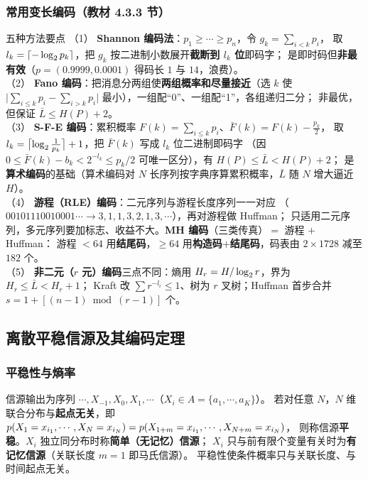 \subsubsection{常用变长编码（教材 4.3.3 节）}
\begin{keypoint}{五种方法要点}
（1） \textbf{Shannon 编码法}：$p_1\ge\cdots\ge p_n$，令 $g_k=\sum_{i<k}p_i$，
取 $l_k=\left\lceil-\log_{2} p_k\right\rceil$，把 $g_k$ 按二进制小数展开\textbf{截断到 $l_k$ 位}即码字；
是即时码但\textbf{非最有效}（$p=(0.9999,0.0001)$ 得码长 $1$ 与 $14$，浪费）。\\
（2） \textbf{Fano 编码}：把消息分两组使\textbf{两组概率和尽量接近}（选 $k$ 使
$\bigl|\sum_{i\le k}p_i-\sum_{i>k}p_i\bigr|$ 最小），一组配“0”、一组配“1”，各组递归二分；
非最优，但保证 $\bar L\le H(P)+2$。\\
（3） \textbf{S-F-E 编码}：累积概率 $F(k)=\sum_{i\le k}p_i$、$\bar F(k)=F(k)-\frac{p_k}{2}$，
取 $l_k=\bigl\lceil\log_{2}\frac{1}{p_k}\bigr\rceil+1$，把 $\bar F(k)$ 写成 $l_k$ 位二进制即码字
（因 $0\le\bar F(k)-b_k<2^{-l_k}\le p_k/2$ 可唯一区分），有 $H(P)\le\bar L<H(P)+2$；
是\textbf{算术编码}的基础（算术编码对 $N$ 长序列按字典序算累积概率，$\bar L$ 随 $N$ 增大逼近 $H$）。\\
（4） \textbf{游程（RLE）编码}：二元序列与游程长度序列一一对应
（$00101110010001\cdots\to3,1,1,3,2,1,3,\cdots$），再对游程做 Huffman；
只适用二元序列，多元序列要加标志、收益不大。\textbf{MH 编码}（三类传真）$=$ 游程 $+$ Huffman：
游程 $<64$ 用\textbf{结尾码}，$\ge64$ 用\textbf{构造码$+$结尾码}，码表由 $2\times1728$ 减至 $182$ 个。\\
（5） \textbf{非二元（$r$ 元）编码}三点不同：熵用 $H_r=H/\log_{2} r$，界为 $H_r\le\bar L<H_r+1$；
Kraft 改 $\sum r^{-l_i}\le1$、树为 $r$ 叉树；Huffman 首步合并 $s=1+[(n-1)\bmod(r-1)]$ 个。
\end{keypoint}

\subsection{离散平稳信源及其编码定理}

\subsubsection{平稳性与熵率}
信源输出为序列 $\cdots,X_{-1},X_0,X_1,\cdots$（$X_i\in A=\{a_1,\cdots,a_K\}$）。
若对任意 $N$，$N$ 维联合分布与\textbf{起点无关}，即
$p\!\left(X_1=x_{i_1},\cdots,X_N=x_{i_N}\right)=p\!\left(X_{1+m}=x_{i_1},\cdots,X_{N+m}=x_{i_N}\right)$，
则称信源\textbf{平稳}。$X_i$ 独立同分布时称\textbf{简单（无记忆）信源}；
$X_i$ 只与前有限个变量有关时为\textbf{有记忆信源}（关联长度 $m=1$ 即马氏信源）。
平稳性使条件概率只与关联长度、与时间起点无关。

